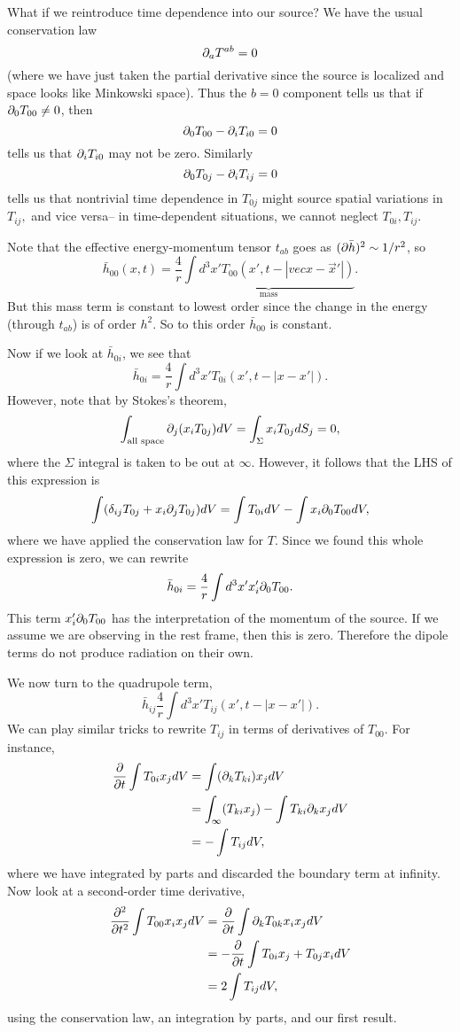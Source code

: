 What if we reintroduce time dependence into our source? We have the usual conservation law
$$\partial_a T^{ab}=0$$
(where we have just taken the partial derivative since the source is localized and space looks like Minkowski space). Thus the $b=0$ component tells us that if $\partial_0 T_{00}\neq 0$, then
$$\partial_0 T_{00}-\partial_i T_{i0}=0$$
tells us that $\partial_i T_{i0}$ may not be zero. Similarly $$\partial_0 T_{0j} -\partial_i T_{ij}=0$$
tells us that nontrivial time dependence in $T_{0j}$ might source spatial variations in $T_{ij},$ and vice versa-- in time-dependent situations, we cannot neglect $T_{0i},T_{ij}$.

Note that the effective energy-momentum tensor $t_{ab}$ goes as $(\partial\bar h)^2 \sim 1/r^2$, so
$$\bar h_{00}(x,t)=\frac{4}{r} \underbrace{\int d^3 x' T_{00}(x',t-|vec x-\vec x'|)}_{\text{mass}}.$$
But this mass term is constant to lowest order since the change in the energy (through $t_{ab}$) is of order $h^2$. So to this order $\bar h_{00}$ is constant.

Now if we look at $\bar h_{0i}$, we see that
$$\bar h_{0i}=\frac{4}{r}\int d^3 x' T_{0i}(x',t-|x-x'|).$$
However, note that by Stokes's theorem,
$$\int_{\text{all space}} \partial_j(x_i T_{0j})dV= \int_\Sigma x_i T_{0j}dS_j =0,$$
where the $\Sigma$ integral is taken to be out at $\infty$. However, it follows that the LHS of this expression is
$$\int (\delta_{ij}T_{0j}+x_i \partial_j T_{0j})dV = \int T_{0i}dV- \int x_i \partial_0 T_{00} dV,$$
where we have applied the conservation law for $T.$ Since we found this whole expression is zero, we can rewrite
$$\bar h_{0i}=\frac{4}{r}\int d^3x' x_i' \partial_0 T_{00}.$$
This term $x_i' \partial_0 T_{00}$ has the interpretation of the momentum of the source. If we assume we are observing in the rest frame, then this is zero. Therefore the dipole terms do not produce radiation on their own.

We now turn to the quadrupole term,
$$\bar h_{ij} \frac{4}{r} \int d^3 x' T_{ij}(x',t-|x-x'|).$$
We can play similar tricks to rewrite $T_{ij}$ in terms of derivatives of $T_{00}$. For instance,
\begin{align*}
    \frac{\partial }{\partial t}\int T_{0i}x_j dV &= \int (\partial_k T_{ki})x_j dV\\
    &= \int_\infty (T_{ki}x_j)-\int T_{ki} \partial_k x_j dV\\
    &= -\int T_{ij}dV,
\end{align*}
where we have integrated by parts and discarded the boundary term at infinity.
Now look at a second-order time derivative,
\begin{align*}
    \frac{\partial^2}{\partial t^2}\int T_{00} x_i x_j dV &= \frac{\partial }{\partial t}\int \partial_k T_{0k}x_i x_j dV\\
    &= -\frac{\partial }{\partial t}\int T_{0i}x_j + T_{0j}x_i dV\\
    &=2\int T_{ij} dV,
\end{align*}
using the conservation law, an integration by parts, and our first result.

